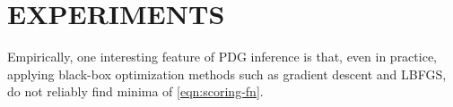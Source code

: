 \documentclass[twoside]{article}
\begin{document}
%
%
\section{EXPERIMENTS} \label{sec:expts}

Empirically, one interesting feature of PDG inference is that, even in practice, applying black-box optimization methods such as gradient descent and LBFGS, do not reliably find minima of \eqref{eqn:scoring-fn}.
\end{document}

